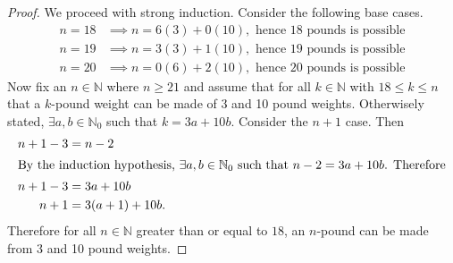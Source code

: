 \documentclass[12pt]{extarticle}
\begin{document}
\begin{proof}
	We proceed with strong induction. Consider the following base cases.
	\begin{align*}
		n=18 &\implies n = 6(3) + 0(10), \text{ hence 18 pounds is possible} \\
		n=19 &\implies n = 3(3) + 1(10), \text{ hence 19 pounds is possible} \\
		n=20 &\implies n = 0(6) + 2(10), \text{ hence 20 pounds is possible}
	\end{align*}
	Now fix an $n \in \mathbb{N}$ where $n \geq 21$ and assume that for all $k \in \mathbb{N}$ with $18 \leq k \leq n$ that a $k$-pound weight can be made of 3 and 10 pound weights. Otherwisely stated, $\exists a,b \in \mathbb{N}_0$ such that $k = 3a + 10b$. Consider the $n+1$ case. Then
	\begin{align*}
		n + 1 - 3 &= n - 2 \\
		\intertext{By the induction hypothesis, $\exists a,b \in \mathbb{N}_0$ such that $n - 2 = 3a + 10b$. Therefore}
		n + 1 -3 &= 3a + 10b \\
		n + 1 &= 3(a + 1) + 10b
	.\end{align*}
	Therefore for all $n \in \mathbb{N}$ greater than or equal to $18$, an $n$-pound can be made from 3 and 10 pound weights.
\end{proof}
\end{document}

